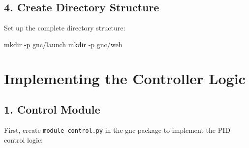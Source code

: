 \documentclass[
  letterpaper,
  DIV=11,
  numbers=noendperiod]{scrreprt}
\newenvironment{Shaded}{\begin{snugshade}}{\end{snugshade}}
\newcommand{\AttributeTok}[1]{\textcolor[rgb]{0.40,0.45,0.13}{#1}}
\newcommand{\FunctionTok}[1]{\textcolor[rgb]{0.28,0.35,0.67}{#1}}
\newcommand{\NormalTok}[1]{\textcolor[rgb]{0.00,0.23,0.31}{#1}}
\begin{document}
\subsection*{4. Create Directory
Structure}\label{create-directory-structure}

Set up the complete directory structure:

\begin{Shaded}
\begin{Highlighting}[]
\FunctionTok{mkdir} \AttributeTok{{-}p}\NormalTok{ gnc/launch}
\FunctionTok{mkdir} \AttributeTok{{-}p}\NormalTok{ gnc/web}
\end{Highlighting}
\end{Shaded}

\section*{Implementing the Controller
Logic}\label{implementing-the-controller-logic}


\subsection*{1. Control Module}\label{control-module}

First, create \texttt{module\_control.py} in the gnc package to
implement the PID control logic:
\end{document}
